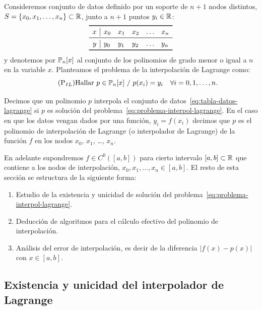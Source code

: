 Consideremos conjunto de datos definido por un soporte de $n+1$ nodos
distintos, $S=\{x_0,x_1,\dots,x_n\}\subset \operatorname{{\mathbb R}}$, junto a $n+1$
puntos $y_i \in \operatorname{{\mathbb R}}$:
\begin{equation}
  \begin{array}{r|lllcl}
    \toprule
    x & x_0 & x_1 & x_2 & \dots & x_n
    \\ \midrule
    y & y_0 & y_1 & y_2 & \dots & y_n
    \\
    \bottomrule
  \end{array}
  \label{eq:tabla-datos-lagrange}
\end{equation}
y denotemos por $\operatorname{{\mathbb P}}_n[x]$ al conjunto de los polinomios de grado
menor o igual a $n$ en la variable $x$. Planteamos el problema de la
interpolación de Lagrange como:
\begin{equation}
  \tag{P$_{IL}$}
  \text{Hallar } p\in\Pol_n[x] \tq p(x_i)=y_i \quad \forall i=0,1,\dots,n.
  \label{eq:problema-interpol-lagrange}
\end{equation}
\begin{definition}
  \label{def:interpolador-lagrange}
  Decimos que un polinomio $p$ interpola el conjunto de
  datos~\eqref{eq:tabla-datos-lagrange} si $p$ es solución del
  problema~\eqref{eq:problema-interpol-lagrange}. En el caso en que
  los datos vengan dados por una función, $y_i=f(x_i)$ decimos que $p$
  es el polinomio de interpolación de Lagrange (o interpolador de
  Lagrange) de la función $f$ en los nodos $x_0$, $x_1$, \dots, $x_n$.
\end{definition} 
En adelante supondremos $f\in C^0([a,b])$ para cierto intervalo
$[a,b]\subset\operatorname{{\mathbb R}}$ que contiene a los nodos de interpolación,
$x_0,x_1,\dots,x_n \in [a,b]$.  El resto de esta sección se estructura
de la siguiente forma:
\begin{enumerate}
\item Estudio de la existencia y unicidad de solución del
  problema~\eqref{eq:problema-interpol-lagrange}.
\item Deducción de algoritmos para el cálculo efectivo del polinomio
  de interpolación.
\item Análisis del error de interpolación, es decir de la diferencia
  $|f(x)-p(x)|$ con $x\in [a,b]$.
\end{enumerate}

\subsection{Existencia y unicidad del interpolador de Lagrange}
\label{sec:exist-y-unic-lagrange}

